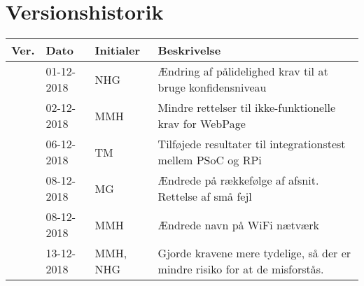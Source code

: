 \documentclass[Kravspecifikation/Kravspec_Main.tex]{subfiles}
\begin{document}
\section{Versionshistorik}
\begin{longtable}{|L{0.07\textwidth}|L{0.15\textwidth}|L{0.13\textwidth}|L{0.55\textwidth}|}
        \hline
        \textbf{Ver.} & \textbf{Dato} & \textbf{Initialer} & \textbf{Beskrivelse}  \\ \hline
         & 01-12-2018 & NHG & Ændring af pålidelighed krav til at bruge konfidensniveau \\ \hline
         & 02-12-2018 & MMH & Mindre rettelser til ikke-funktionelle krav for WebPage \\ \hline
         & 06-12-2018 & TM & Tilføjede resultater til integrationstest mellem PSoC og RPi \\ \hline
         & 08-12-2018 & MG & Ændrede på rækkefølge af afsnit. Rettelse af små fejl  \\ \hline
         & 08-12-2018 & MMH & Ændrede navn på WiFi nætværk \\ \hline
         & 13-12-2018 & MMH, NHG & Gjorde kravene mere tydelige, så der er mindre risiko for at de misforstås.
\end{longtable}
\end{document}
